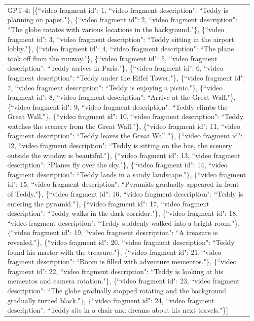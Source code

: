 \begin{table}[h!]
\begin{minipage}{0.98\linewidth}
\begin{tcolorbox}
\begin{tabular}{p{0.99\linewidth}}
\begin{minipage}{0.99\linewidth}
GPT-4: \textcolor[RGB]{52, 152, 219}{[\{``video fragment id": 1, ``video fragment description": ``Teddy is planning on paper."\}, \{``video fragment id": 2, ``video fragment description": ``The globe rotates with various locations in the background."\}, \{``video fragment id": 3, ``video fragment description": ``Teddy sitting in the airport lobby."\}, \{``video fragment id": 4, ``video fragment description": ``The plane took off from the runway."\}, \{``video fragment id": 5, ``video fragment description": ``Teddy arrives in Paris."\}, \{``video fragment id": 6, ``video fragment description": ``Teddy under the Eiffel Tower."\}, \{``video fragment id": 7, ``video fragment description": ``Teddy is enjoying a picnic."\}, \{``video fragment id": 8, ``video fragment description": ``Arrive at the Great Wall."\}, \{``video fragment id": 9, ``video fragment description": ``Teddy climbs the Great Wall."\}, \{``video fragment id": 10, ``video fragment description": ``Teddy watches the scenery from the Great Wall."\}, \{``video fragment id": 11, ``video fragment description": ``Teddy leaves the Great Wall."\}, \{``video fragment id": 12, ``video fragment description": ``Teddy is sitting on the bus, the scenery outside the window is beautiful."\}, \{``video fragment id": 13, ``video fragment description": ``Planes fly over the sky."\}, \{``video fragment id": 14, ``video fragment description": ``Teddy lands in a sandy landscape."\}, \{``video fragment id": 15, ``video fragment description": ``Pyramids gradually appeared in front of Teddy."\}, \{``video fragment id": 16, ``video fragment description": ``Teddy is entering the pyramid."\}, \{``video fragment id": 17, ``video fragment description": ``Teddy walks in the dark corridor."\}, \{``video fragment id": 18, ``video fragment description": ``Teddy suddenly walked into a bright room."\}, \{``video fragment id": 19, ``video fragment description": ``A treasure is revealed."\}, \{``video fragment id": 20, ``video fragment description": ``Teddy found his master with the treasure."\}, \{``video fragment id": 21, ``video fragment description": ``Room is filled with adventure mementos."\}, \{``video fragment id": 22, ``video fragment description": ``Teddy is looking at his mementos and camera rotation."\}, \{``video fragment id": 23, ``video fragment description": ``The globe gradually stopped rotating and the background gradually turned black."\}, \{``video fragment id": 24, ``video fragment description": ``Teddy sits in a chair and dreams about his next travels."\}]}


\end{minipage}
\end{tabular}
\end{tcolorbox}
\end{minipage}
\end{table}
